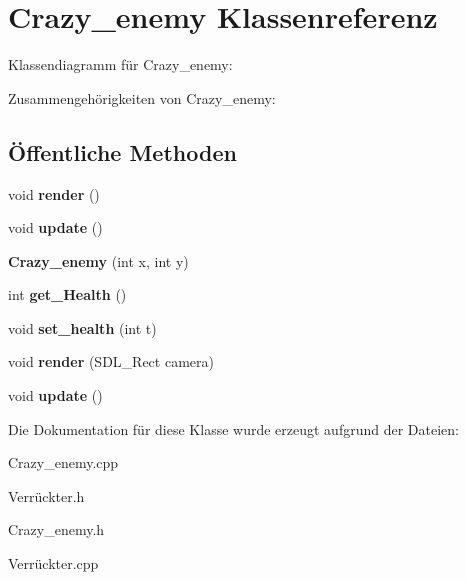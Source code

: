 \hypertarget{class_crazy__enemy}{\section{Crazy\-\_\-enemy Klassenreferenz}
\label{class_crazy__enemy}
}


Klassendiagramm für Crazy\-\_\-enemy\-:


Zusammengehörigkeiten von Crazy\-\_\-enemy\-:
\subsection*{Öffentliche Methoden}
\begin{DoxyCompactItemize}
\item 
\hypertarget{class_crazy__enemy_ab3f0fd1c099d35b9a10aaa51064030cc}{void {\bfseries render} ()}\label{class_crazy__enemy_ab3f0fd1c099d35b9a10aaa51064030cc}

\item 
\hypertarget{class_crazy__enemy_adf3b3ef132ca7c300a223af3b4fb4fc7}{void {\bfseries update} ()}\label{class_crazy__enemy_adf3b3ef132ca7c300a223af3b4fb4fc7}

\item 
\hypertarget{class_crazy__enemy_a190c30bf8cc3c818698b3fab6273305a}{{\bfseries Crazy\-\_\-enemy} (int x, int y)}\label{class_crazy__enemy_a190c30bf8cc3c818698b3fab6273305a}

\item 
\hypertarget{class_crazy__enemy_a475f5dd8aff8e7ed7a0a6c107e510f10}{int {\bfseries get\-\_\-\-Health} ()}\label{class_crazy__enemy_a475f5dd8aff8e7ed7a0a6c107e510f10}

\item 
\hypertarget{class_crazy__enemy_aca0e6e11b0cf95954141771b710e78ae}{void {\bfseries set\-\_\-health} (int t)}\label{class_crazy__enemy_aca0e6e11b0cf95954141771b710e78ae}

\item 
\hypertarget{class_crazy__enemy_a4fc63fd437c01b6522beaf468c218f4a}{void {\bfseries render} (S\-D\-L\-\_\-\-Rect camera)}\label{class_crazy__enemy_a4fc63fd437c01b6522beaf468c218f4a}

\item 
\hypertarget{class_crazy__enemy_adf3b3ef132ca7c300a223af3b4fb4fc7}{void {\bfseries update} ()}\label{class_crazy__enemy_adf3b3ef132ca7c300a223af3b4fb4fc7}

\end{DoxyCompactItemize}


Die Dokumentation für diese Klasse wurde erzeugt aufgrund der Dateien\-:\begin{DoxyCompactItemize}
\item 
Crazy\-\_\-enemy.\-cpp\item 
Verrückter.\-h\item 
Crazy\-\_\-enemy.\-h\item 
Verrückter.\-cpp\end{DoxyCompactItemize}
